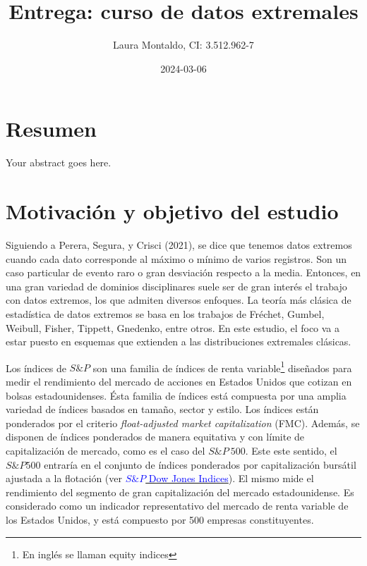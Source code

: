 \documentclass[
  oneside]{article}
\title{Entrega: curso de datos extremales}
\author{Laura Montaldo, CI: 3.512.962-7}
\date{2024-03-06}
\begin{document}
\maketitle

\newtheorem{theorem}{Teorema}[section]

\newpage

\thispagestyle{empty}

\maketitle

\newpage

\tableofcontents

\newpage

\hypertarget{resumen}{%
\section{Resumen}\label{resumen}}

Your abstract goes here.

\newpage

\section{Motivación y objetivo del estudio}

Siguiendo a Perera, Segura, y Crisci (2021), se dice que tenemos datos
extremos cuando cada dato corresponde al máximo o mínimo de varios
registros. Son un caso particular de evento raro o gran desviación
respecto a la media. Entonces, en una gran variedad de dominios
disciplinares suele ser de gran interés el trabajo con datos extremos,
los que admiten diversos enfoques. La teoría más clásica de estadística
de datos extremos se basa en los trabajos de Fréchet, Gumbel, Weibull,
Fisher, Tippett, Gnedenko, entre otros. En este estudio, el foco va a
estar puesto en esquemas que extienden a las distribuciones extremales
clásicas.

Los índices de \(S\&P\) son una familia de índices de renta
variable\footnote{En inglés se llaman equity indices} diseñados para
medir el rendimiento del mercado de acciones en Estados Unidos que
cotizan en bolsas estadounidenses. Ésta familia de índices está
compuesta por una amplia variedad de índices basados en tamaño, sector y
estilo. Los índices están ponderados por el criterio
\textit{float-adjusted market capitalization} (FMC). Además, se disponen
de índices ponderados de manera equitativa y con límite de
capitalización de mercado, como es el caso del \(S\&P\:500\). Este este
sentido, el \(S\&P 500\) entraría en el conjunto de índices ponderados
por capitalización bursátil ajustada a la flotación (ver
\href{http://www.overleaf.com}{\textcolor{blue}{$S\&P$ Dow Jones Indices}}).
El mismo mide el rendimiento del segmento de gran capitalización del
mercado estadounidense. Es considerado como un indicador representativo
del mercado de renta variable de los Estados Unidos, y está compuesto
por 500 empresas constituyentes.
\end{document}
